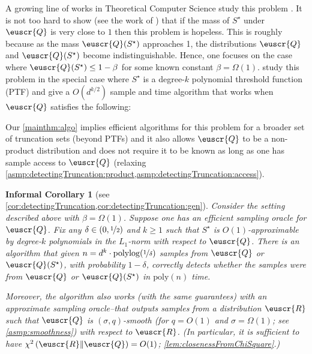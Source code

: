 \documentclass[11pt]{article}
\theoremstyle{plain}
\newtheorem{infcorollary}[theorem]{Informal Corollary}
\theoremstyle{definition}
\theoremstyle{remark}
\newcommand{\inparen}[1]{\left(#1\right)}
\newcommand{\chidiv}[2]{\chi^2\inparen{#1\|#2}}
\newcommand{\nfrac}[2]{\nicefrac{#1}{#2}}
\newcommand{\poly}{\mathrm{poly}}
\newcommand{\polylog}{\mathrm{polylog}}
\newcommand{\iid}{i.i.d.}
\newcommand{\customcal}[1]{\euscr{#1}}
\newcommand{\cQ}{\customcal{Q}}
\newcommand{\cR}{\customcal{R}}
\newcommand{\nL}{L}
\begin{document}
        A growing line of works in Theoretical Computer Science study this problem \cite{de2023detectingConvex,he2023testingjuntatruncation,de2024detecting}.
        It is not too hard to show (see the work of \citet*{de2024detecting}) that if the mass of $S^\star$ under $\cQ$ is very close to $1$ then this problem is hopeless.
        This is roughly because as the mass $\cQ(S^\star)$ approaches 1, the distributions $\cQ$ and $\cQ(S^\star)$ become indistinguishable. 
        Hence, one focuses on the case where $\cQ(S^\star)\leq 1-\beta$ for some known constant $\beta=\Omega(1)$.
        \citet*{de2024detecting} study this problem in the special case where $S^\star$ is a degree-$k$ polynomial threshold function (PTF) and give a $O(d^{k/2})$ sample and time algorithm that works when $\cQ$ satisfies the following:
        Our \cref{mainthm:algo} implies efficient algorithms for this problem for a broader set of truncation sets (beyond PTFs) and it also allows $\cQ$ to be a non-product distribution and does not require it to be known as long as one has sample access to $\cQ$ (relaxing \cref{asmp:detectingTruncation:product,asmp:detectingTruncation:access}).
        \begin{infcorollary}[see \cref{cor:detectingTruncation,cor:detectingTruncation:gen}]\label{infcor:detectingTruncation}
            Consider the setting described above with $\beta=\Omega(1)$.
            Suppose one has an efficient sampling oracle for $\cQ$.
            Fix any $\delta\in (0,\nfrac{1}{2})$ and $k\geq 1$ such that $S^\star$ is $O(1)$-approximable by degree-$k$ polynomials in the $\nL_1$-norm with respect to $\cQ$.
            There is an algorithm that given $n=d^{k}\cdot \polylog({\nfrac{1}{\delta}})$ samples from $\cQ$ or $\cQ(S^\star)$, with probability $1-\delta$, correctly detects whether the samples were from $\cQ$ or $\cQ(S^\star)$ in $\poly(n)$ time.
            
            Moreover, the algorithm also works (with the same guarantees) with an \emph{approximate} sampling oracle--that outputs samples from a distribution $\cR$ such that $\cQ$ is $(\sigma,q)$-smooth (for $q=O(1)$ and $\sigma=\Omega(1)$; see \cref{asmp:smoothness}) with respect to $\cR$. 
            (In particular, it is sufficient to have $\chidiv{\cR}{\cQ}=O(1)$; \cref{lem:closenessFromChiSquare}.)
        \end{infcorollary}
\end{document}
